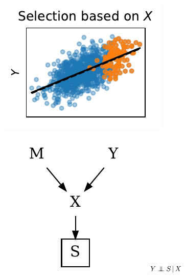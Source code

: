 \documentclass[a4paper,num-refs]{oup-contemporary}
\newcommand\indep{\protect\mathpalette{\protect\independenT}{\perp}}
\def\independenT#1#2{\mathrel{\rlap{$#1#2$}\mkern3.5mu{#1#2}}}
\begin{document}
\begin{figure}
\begin{minipage}{.3\textwidth}
  \begin{minipage}{\textwidth}
\vspace{-7pt}
  \begin{minipage}{.57\textwidth}
    \includegraphics[width=\textwidth]{figures/simulations/selecting_on_parent_or_child/selection_bias_3.pdf}
  \end{minipage}%
  \begin{minipage}{.42\textwidth}
    \includegraphics[width=\textwidth]{figures/graphs/sample_selection_bias_3.pdf}
    \centering
    \(Y \indep S \, | \, X\)
  \end{minipage}


\end{minipage}
\end{minipage}
\end{figure}
\end{document}
